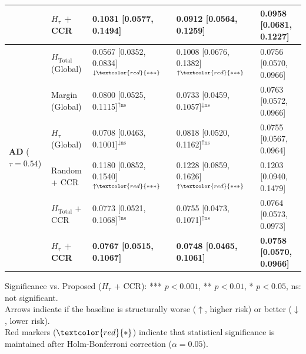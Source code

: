 \begin{table}[htbp]
{\begin{tabular}{l l l l l}
  & \textbf{$H_\tau$ + CCR} & \textbf{0.1031 [0.0577, 0.1494]} & \textbf{0.0912 [0.0564, 0.1259]} & \textbf{0.0958 [0.0681, 0.1227]} \\
\midrule
\multirow{6}{*}{\textbf{AD} ($\tau=0.54$)} & $H_{\text{Total}}$ (Global) & 0.0567 [0.0352, 0.0834]$^{\downarrow\textcolor{red}{***}}$ & 0.1008 [0.0676, 0.1382]$^{\uparrow\textcolor{red}{***}}$ & 0.0756 [0.0570, 0.0966] \\
  & Margin (Global) & 0.0800 [0.0525, 0.1115]$^{\uparrow\text{ns}}$ & 0.0733 [0.0459, 0.1057]$^{\downarrow\text{ns}}$ & 0.0763 [0.0572, 0.0966] \\
  & $H_\tau$ (Global) & 0.0708 [0.0463, 0.1001]$^{\downarrow\text{ns}}$ & 0.0818 [0.0520, 0.1162]$^{\uparrow\text{ns}}$ & 0.0755 [0.0567, 0.0964] \\
  & Random + CCR & 0.1180 [0.0852, 0.1540]$^{\uparrow\textcolor{red}{***}}$ & 0.1228 [0.0859, 0.1626]$^{\uparrow\textcolor{red}{***}}$ & 0.1203 [0.0940, 0.1479] \\
  & $H_{\text{Total}}$ + CCR & 0.0773 [0.0521, 0.1068]$^{\uparrow\text{ns}}$ & 0.0755 [0.0473, 0.1071]$^{\uparrow\text{ns}}$ & 0.0764 [0.0573, 0.0973] \\
  & \textbf{$H_\tau$ + CCR} & \textbf{0.0767 [0.0515, 0.1067]} & \textbf{0.0748 [0.0465, 0.1061]} & \textbf{0.0758 [0.0570, 0.0966]} \\
\bottomrule
\end{tabular}
}
\vspace{1ex}
{\raggedright \footnotesize
Significance vs. Proposed ($H_\tau$ + CCR): *** $p<0.001$, ** $p<0.01$, * $p<0.05$, ns: not significant. \\
Arrows indicate if the baseline is structurally worse ($\uparrow$, higher risk) or better ($\downarrow$, lower risk). \\
Red markers ($\textcolor{red}{*}$) indicate that statistical significance is maintained after Holm-Bonferroni correction ($\alpha=0.05$). \par}
\end{table}